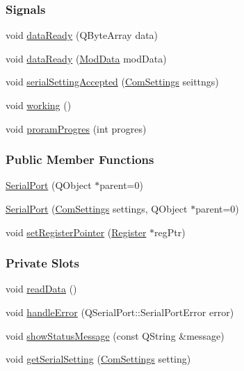 \subsubsection*{Signals}
\begin{DoxyCompactItemize}
\item 
void \mbox{\hyperlink{classSerialPort_a4653f9aa7114546faa5627ee5810a47d}{data\+Ready}} (Q\+Byte\+Array data)
\item 
void \mbox{\hyperlink{classSerialPort_aa958ae188335f80fd08ebad93e977134}{data\+Ready}} (\mbox{\hyperlink{serialport_8h_a2331c0232719069f0bce03c249d2eec6}{Mod\+Data}} mod\+Data)
\item 
void \mbox{\hyperlink{classSerialPort_a30f185f507d89b40a0204b6472da3217}{serial\+Setting\+Accepted}} (\mbox{\hyperlink{structComSettings}{Com\+Settings}} seittngs)
\item 
void \mbox{\hyperlink{classSerialPort_ae92426fd329e2a5ec42b0255c5dcbdc5}{working}} ()
\item 
void \mbox{\hyperlink{classSerialPort_a38b94a606dab2af9cbeac4f48ddd831c}{proram\+Progres}} (int progres)
\end{DoxyCompactItemize}
\subsubsection*{Public Member Functions}
\begin{DoxyCompactItemize}
\item 
\mbox{\hyperlink{classSerialPort_ae68e4a28e607b4acbab2c2a894cb3e2b}{Serial\+Port}} (Q\+Object $\ast$parent=0)
\item 
\mbox{\hyperlink{classSerialPort_aa9fb64a8aced84ab80eee65680298976}{Serial\+Port}} (\mbox{\hyperlink{structComSettings}{Com\+Settings}} settings, Q\+Object $\ast$parent=0)
\item 
void \mbox{\hyperlink{classSerialPort_a273c33e0eac534d7bdeafed79157e2e4}{set\+Register\+Pointer}} (\mbox{\hyperlink{classRegister}{Register}} $\ast$reg\+Ptr)
\end{DoxyCompactItemize}
\subsubsection*{Private Slots}
\begin{DoxyCompactItemize}
\item 
void \mbox{\hyperlink{classSerialPort_a0b8fe1371e829199856e8cae942de94e}{read\+Data}} ()
\item 
void \mbox{\hyperlink{classSerialPort_a307128aa2e5ad6b89e47898bff7a48e0}{handle\+Error}} (Q\+Serial\+Port\+::\+Serial\+Port\+Error error)
\item 
void \mbox{\hyperlink{classSerialPort_a9153ab33cbb73d5138b871e52c343e58}{show\+Status\+Message}} (const Q\+String \&message)
\item 
void \mbox{\hyperlink{classSerialPort_a39602f4cf8fe4570fa3b69d633534be5}{get\+Serial\+Setting}} (\mbox{\hyperlink{structComSettings}{Com\+Settings}} setting)
\end{DoxyCompactItemize}
